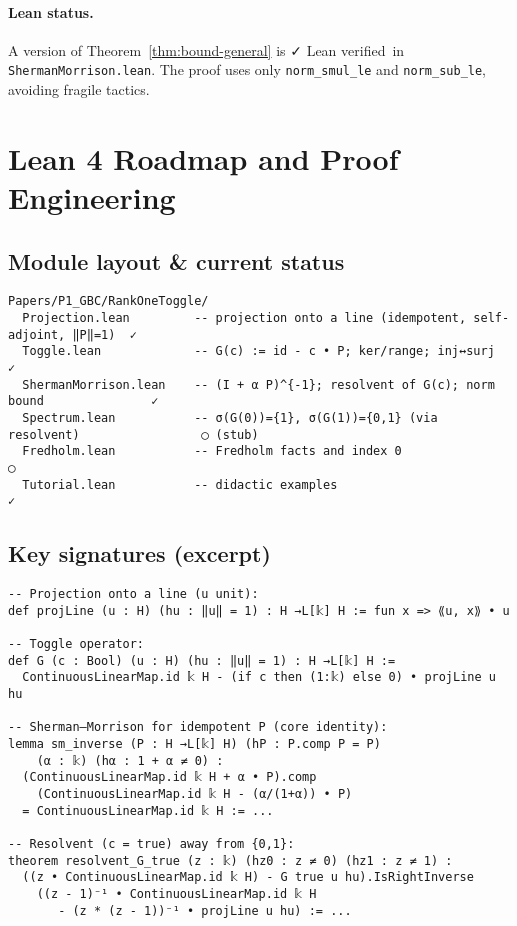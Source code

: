 \documentclass[11pt]{article}
\theoremstyle{definition}
\newcommand{\leanok}{\textsf{\small \textcolor{green!60!black}{✓ Lean verified}}}
\begin{document}
\paragraph{Lean status.} A version of Theorem~\ref{thm:bound-general} is \leanok\ in \texttt{ShermanMorrison.lean}. The proof uses only \texttt{norm\_smul\_le} and \texttt{norm\_sub\_le}, avoiding fragile tactics.

\section{Lean 4 Roadmap and Proof Engineering}\label{sec:lean}

\subsection*{Module layout \& current status}
\begin{verbatim}
Papers/P1_GBC/RankOneToggle/
  Projection.lean         -- projection onto a line (idempotent, self-adjoint, ‖P‖=1)  ✓
  Toggle.lean             -- G(c) := id - c • P; ker/range; inj↔surj                    ✓
  ShermanMorrison.lean    -- (I + α P)^{-1}; resolvent of G(c); norm bound               ✓
  Spectrum.lean           -- σ(G(0))={1}, σ(G(1))={0,1} (via resolvent)                 ◯ (stub)
  Fredholm.lean           -- Fredholm facts and index 0                                  ◯
  Tutorial.lean           -- didactic examples                                          ✓
\end{verbatim}

\subsection*{Key signatures (excerpt)}  %
\begin{lstlisting}
-- Projection onto a line (u unit):
def projLine (u : H) (hu : ‖u‖ = 1) : H →L[𝕜] H := fun x => ⟪u, x⟫ • u

-- Toggle operator:
def G (c : Bool) (u : H) (hu : ‖u‖ = 1) : H →L[𝕜] H :=
  ContinuousLinearMap.id 𝕜 H - (if c then (1:𝕜) else 0) • projLine u hu

-- Sherman–Morrison for idempotent P (core identity):
lemma sm_inverse (P : H →L[𝕜] H) (hP : P.comp P = P)
    (α : 𝕜) (hα : 1 + α ≠ 0) :
  (ContinuousLinearMap.id 𝕜 H + α • P).comp
    (ContinuousLinearMap.id 𝕜 H - (α/(1+α)) • P)
  = ContinuousLinearMap.id 𝕜 H := ...

-- Resolvent (c = true) away from {0,1}:
theorem resolvent_G_true (z : 𝕜) (hz0 : z ≠ 0) (hz1 : z ≠ 1) :
  ((z • ContinuousLinearMap.id 𝕜 H) - G true u hu).IsRightInverse
    ((z - 1)⁻¹ • ContinuousLinearMap.id 𝕜 H
       - (z * (z - 1))⁻¹ • projLine u hu) := ...
\end{lstlisting}
\end{document}
